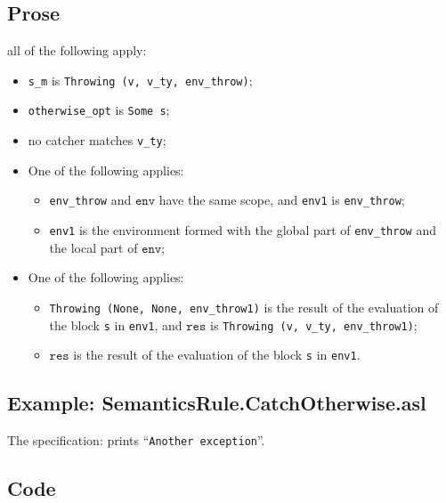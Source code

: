 \documentclass{book}
\newcommand\env[0]{\texttt{env}}
\newcommand\vres[0]{\texttt{res}}
\begin{document}
    \subsection{Prose}
    all of the following apply:
    \begin{itemize}
    \item \texttt{s\_m} is \texttt{Throwing (v, v\_ty, env\_throw)};
    \item \texttt{otherwise\_opt} is \texttt{Some s};
    \item no catcher matches \texttt{v\_ty};
    \item One of the following applies:
      \begin{itemize}
      \item \texttt{env\_throw} and $\env$ have the same scope, and \texttt{env1} is \texttt{env\_throw};
      \item \texttt{env1} is the environment formed with the global part of \texttt{env\_throw}
        and the local part of $\env$;
      \end{itemize}
    \item One of the following applies:
      \begin{itemize}
      \item \texttt{Throwing (None, None, env\_throw1)} is the result of the evaluation of
        the block \texttt{s} in \texttt{env1}, and $\vres$ is \texttt{Throwing (v, v\_ty, env\_throw1)};
      \item $\vres$ is the result of the evaluation of the block \texttt{s} in \texttt{env1}.
      \end{itemize}
    \end{itemize}

    \subsection{Example: SemanticsRule.CatchOtherwise.asl}
     The specification:
     prints ``\texttt{Another exception}''.

  \subsection{Code}
\end{document}
